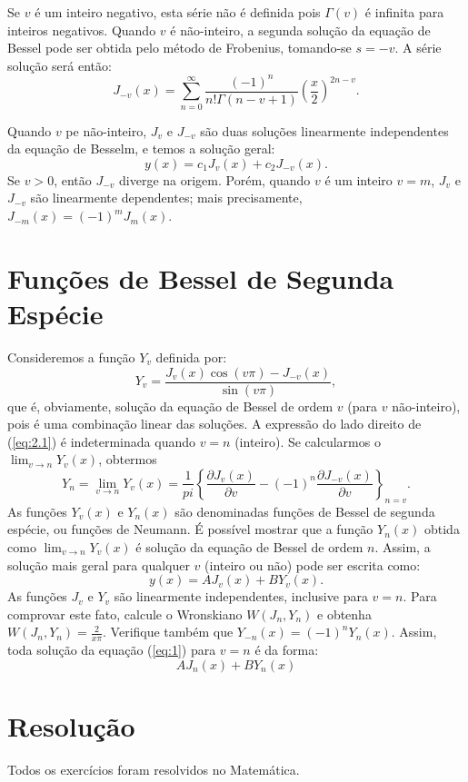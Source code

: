 \documentclass[10pt,a4paper]{article}
\newcommand{\prt}[1]{\left(#1\right)}
\newcommand{\chv}[1]{\left\{#1\right\}}
\let\oldcos\cos
\let\oldsin\sin
\renewcommand{\cos}[1]{\oldcos{\prt{#1}}}
\renewcommand{\sin}[1]{\oldsin{\prt{#1}}}
\begin{document}
	Se $v$ é um inteiro negativo, esta série não é definida pois $\Gamma(v)$ é infinita para inteiros negativos. Quando $v$ é não-inteiro, a segunda solução da equação de Bessel pode ser obtida pelo método de Frobenius, tomando-se $s=-v$. A série solução será então:
	\begin{equation}
		J_{-v}(x) = \sum_{n=0}^\infty \frac{(-1)^n}{n!\Gamma(n-v+1)}\prt{\frac{x}{2}}^{2n-v}.
	\end{equation}
	
	Quando $v$ pe não-inteiro, $J_v$ e $J_{-v}$ são duas soluções linearmente independentes da equação de Besselm, e temos a solução geral:
	\[y(x) = c_1J_v(x) + c_2J_{-v}(x).\]
	Se $v>0$, então $J_{-v}$ diverge na origem. Porém, quando $v$ é um inteiro $v=m$, $J_v$ e $J_{-v}$ são linearmente dependentes; mais precisamente, $J_{-m}(x)=(-1)^mJ_m(x)$.
	
	\section{Funções de Bessel de Segunda Espécie}
	Consideremos a função $Y_v$ definida por:
	\begin{equation}
		Y_v = \frac{J_v(x)\cos{v\pi}-J_{-v}(x)}{\sin{v\pi}},
		\label{eq:2.1}
	\end{equation}
	que é, obviamente, solução da equação de Bessel de ordem $v$ (para $v$ não-inteiro), pois é uma combinação linear das soluções. A expressão do lado direito de (\ref{eq:2.1}) é indeterminada quando $v=n$ (inteiro). Se calcularmos o $\lim_{v\rightarrow n}Y_v(x)$, obtermos
	\[Y_n = \lim_{v\rightarrow n} Y_v(x) = \frac{1}{pi}\chv{\frac{\partial J_v(x)}{\partial v} -(-1)^n \frac{\partial J_{-v}(x)}{\partial v}}_{n=v}.\]
	As funções $Y_v(x)$ e $Y_n(x)$ são denominadas funções de Bessel de segunda espécie, ou funções de Neumann. É possível mostrar que a função $Y_n(x)$ obtida como $\lim_{v\rightarrow n} Y_v(x)$ é solução da equação de Bessel de ordem $n$. Assim, a solução mais geral para qualquer $v$ (inteiro ou não) pode ser escrita como:
	\[y(x) = AJ_v(x) + BY_v(x).\]
	As funções $J_v$ e $Y_v$ são linearmente independentes, inclusive para $v=n$. Para comprovar este fato, calcule o Wronskiano $W(J_n,Y_n)$ e obtenha $W(J_n,Y_n)=\frac{2}{x\pi}$. Verifique também que $Y_{-n}(x)=(-1)^nY_n(x)$. Assim, toda solução da equação (\ref{eq:1}) para $v=n$ é da forma:
	\[AJ_n(x) + BY_n(x)\]
	
	\section{Resolução}
	Todos os exercícios foram resolvidos no Matemática.
\end{document}
